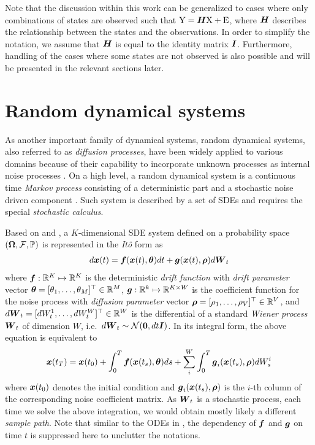 Note that the discussion within this work can be generalized to  cases where only combinations of states are observed such that $\mathrm{Y} = \boldsymbol{H}\mathrm{X} + \mathrm{E}$, where $\boldsymbol{H}$ describes the relationship between the states and the observations.
In order to simplify the notation, we assume that $\boldsymbol{H}$ is equal to the identity matrix $\boldsymbol{I}$.
Furthermore, handling of the cases where some states are not observed is also possible and will be presented in the relevant sections later.

\section{Random dynamical systems}
\label{sec-sdes}
As another important family of dynamical systems, random dynamical systems, also referred to as \emph{diffusion processes}, have been widely applied to various domains because of their capability to incorporate unknown processes as internal noise processes \citep{vrettas2011estimating}.
On a high level, a random dynamical system is a continuous time \emph{Markov process} consisting of a deterministic part and a stochastic noise driven component \citep{riesinger2016solving}.
Such system is described by a set of SDEs and requires the special \emph{stochastic calculus}.

Based on \cite{oksendal2013stochastic} and \cite{vrettas2015variational}, a $K$-dimensional SDE system defined on a probability space $(\boldsymbol{\Omega}, \mathcal{F}, \mathbb{P})$ is represented in the \emph{It\^{o}} form as
\begin{align}
    d\boldsymbol{x}(t) = \boldsymbol{f}(\boldsymbol{x}(t), \boldsymbol{\theta}) dt + \boldsymbol{g}(\boldsymbol{x}(t), \boldsymbol{\rho}) d\boldsymbol{W}_t
\end{align}
where $\boldsymbol{f}: \mathbb{R}^K \mapsto \mathbb{R}^K$ is the deterministic \emph{drift function} with \emph{drift parameter} vector $\boldsymbol{\theta} = [\theta_{1},\dots,\theta_{M}]^\top \in \mathbb{R}^M$, $\boldsymbol{g}: \mathbb{R}^k \mapsto \mathbb{R}^{K \times W}$ is the coefficient function for the noise process with \emph{diffusion parameter} vector $\boldsymbol{\rho} = [\rho_{1},\dots,\rho_{V}]^\top \in \mathbb{R}^V$, and $d\boldsymbol{W}_t = [dW^{1}_{t},\dots,dW^{W}_{t}]^\top \in \mathbb{R}^W$ is the differential of a standard \emph{Wiener process} $\boldsymbol{W}_t$ of dimension $W$, i.e.\ $d\boldsymbol{W}_t \sim \mathcal{N}(\boldsymbol{0}, dt\boldsymbol{I})$.
In its integral form, the above equation is equivalent to
\begin{align}
    \boldsymbol{x}(t_{T}) = \boldsymbol{x}(t_{0}) 
    + \int_0^T{\boldsymbol{f}(\boldsymbol{x}(t_{s}), \boldsymbol{\theta}) ds}
    + \sum_i^W{\int_0^T{\boldsymbol{g}_{i}(\boldsymbol{x}(t_{s}), \boldsymbol{\rho}) dW^{i}_{s}}}
\end{align}
where $\boldsymbol{x}(t_{0})$ denotes the initial condition and $\boldsymbol{g}_{i}(\boldsymbol{x}(t_{s}), \boldsymbol{\rho})$ is the $i$-th column of the corresponding noise coefficient matrix.
As $\boldsymbol{W}_t$ is a stochastic process, each time we solve the above integration, we would obtain mostly likely a different \emph{sample path}.
Note that similar to the ODEs in , the dependency of $\boldsymbol{f}$ and $\boldsymbol{g}$ on time $t$ is suppressed here to unclutter the notations.

